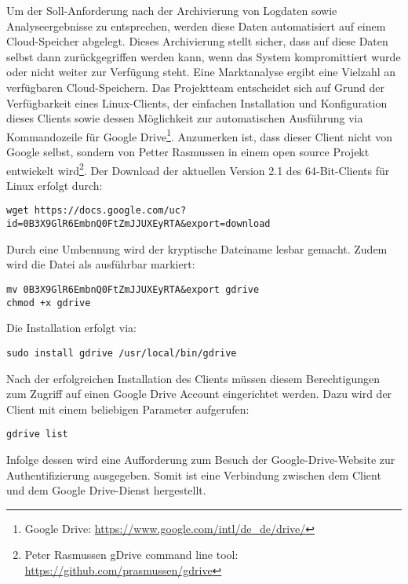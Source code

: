 Um der Soll-Anforderung nach der Archivierung von Logdaten sowie Analyseergebnisse zu entsprechen, werden diese Daten automatisiert auf einem Cloud-Speicher abgelegt. Dieses Archivierung stellt sicher, dass auf diese Daten selbst dann zurückgegriffen werden kann, wenn das System kompromittiert wurde oder nicht weiter zur Verfügung steht. Eine Marktanalyse ergibt eine Vielzahl an verfügbaren Cloud-Speichern. Das Projektteam entscheidet sich auf Grund der Verfügbarkeit eines Linux-Clients, der einfachen Installation und Konfiguration dieses Clients sowie dessen Möglichkeit zur automatischen Ausführung via Kommandozeile für Google Drive\footnote{ Google Drive: \url{https://www.google.com/intl/de_de/drive/}}. Anzumerken ist, dass dieser Client nicht von Google selbst, sondern von Petter Rasmussen in einem open source Projekt entwickelt wird\footnote{ Peter Rasmussen gDrive command line tool: \url{https://github.com/prasmussen/gdrive}}. Der Download der aktuellen Version 2.1 des 64-Bit-Clients für Linux erfolgt durch:

\begin{lstlisting}[style=customc]
wget https://docs.google.com/uc?id=0B3X9GlR6EmbnQ0FtZmJJUXEyRTA&export=download
\end{lstlisting}

Durch eine Umbennung wird der kryptische Dateiname lesbar gemacht. Zudem wird die Datei als ausführbar markiert:

\begin{lstlisting}[style=customc]
mv 0B3X9GlR6EmbnQ0FtZmJJUXEyRTA&export gdrive
chmod +x gdrive
\end{lstlisting}

Die Installation erfolgt via:

\begin{lstlisting}[style=customc]
sudo install gdrive /usr/local/bin/gdrive
\end{lstlisting}

Nach der erfolgreichen Installation des Clients müssen diesem Berechtigungen zum Zugriff auf einen Google Drive Account eingerichtet werden. Dazu wird der Client mit einem beliebigen Parameter aufgerufen:

\begin{lstlisting}[style=customc]
gdrive list
\end{lstlisting}

Infolge dessen wird eine Aufforderung zum Besuch der Google-Drive-Website zur Authentifizierung ausgegeben. Somit ist eine Verbindung zwischen dem Client und dem Google Drive-Dienst hergestellt.

